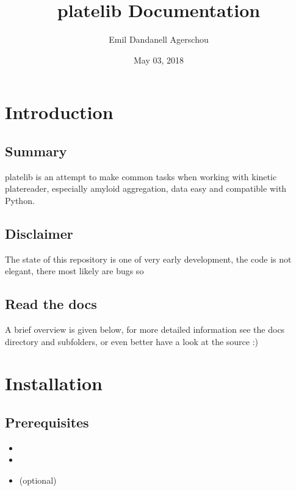 \documentclass[letterpaper,10pt,english]{sphinxmanual}
\title{platelib Documentation}
\date{May 03, 2018}
\author{Emil Dandanell Agerschou}
\begin{document}
\maketitle
\sphinxtableofcontents
{}\label{\detokenize{index::doc}}



\chapter{Introduction}
\label{\detokenize{introduction:introduction}}\label{\detokenize{introduction::doc}}\label{\detokenize{introduction:welcome-to-the-platelib-documentation}}

\section{Summary}
\label{\detokenize{introduction:summary}}
platelib is an attempt to make common tasks when working
with kinetic platereader, especially amyloid aggregation,
data easy and compatible with Python.


\section{Disclaimer}
\label{\detokenize{introduction:disclaimer}}
The state of this repository is one of very early development,
the code is not elegant, there most likely are bugs so


\section{Read the docs}
\label{\detokenize{introduction:read-the-docs}}
A brief overview is given below, for more detailed information
see the docs directory and subfolders,
or even better have a look at the source :)


\chapter{Installation}
\label{\detokenize{install:installation}}\label{\detokenize{install::doc}}

\section{Prerequisites}
\label{\detokenize{install:prerequisites}}\begin{itemize}
\item {} 

\item {} 

\item {} 
 (optional)

\end{itemize}
\end{document}

